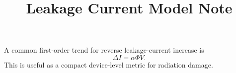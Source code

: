 \documentclass[11pt]{article}
\title{Leakage Current Model Note}
\begin{document}
\maketitle

A common first-order trend for reverse leakage-current increase is
\[
\Delta I = \alpha \Phi V.
\]
This is useful as a compact device-level metric for radiation damage.
\end{document}
